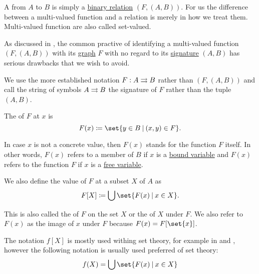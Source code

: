 \begin{definition}\label{def:multi_valued_function}
  A  from \( A \) to \( B \) is simply a \hyperref[def:binary_relation]{binary relation} \( (F, (A, B)) \). For us the difference between a multi-valued function and a relation is merely in how we treat them. Multi-valued function are also called set-valued.

  As discussed in , the common practive of identifying a multi-valued function \( (F, (A, B)) \) with its \hyperref[def:binary_relation/graph]{graph} \( F \) with no regard to its \hyperref[def:binary_relation/signature]{signature} \( (A, B) \) has serious drawbacks that we wish to avoid.

  We use the more established notation \( F: A \rightrightarrows B \) rather than \( (F, (A, B)) \) and call the string of symbols \( A \rightrightarrows B \) the signature of \( F \) rather than the tuple \( (A, B) \).

  \begin{thmenum}[series=def:multi_valued_function]
     The  of \( F \) at \( x \) is
    \begin{equation*}
      F(x) \coloneqq \set{ y \in B \given (x, y) \in F }.
    \end{equation*}

    In case \( x \) is not a concrete value, then \( F(x) \) stands for the function \( F \) itself. In other words, \( F(x) \) refers to a member of \( B \) if \( x \) is a \hyperref[def:first_order_syntax/formula_bound_variables]{bound variable} and \( F(x) \) refers to the function \( F \) if \( x \) is a \hyperref[def:first_order_syntax/formula_free_variables]{free variable}.

     We also define the value of \( F \) at a subset \( X \) of \( A \) as
    \begin{equation*}
      F[X] \coloneqq \bigcup \set{ F(x) \given x \in X }.
    \end{equation*}

    This is also called the  of \( F \) on the set \( X \) or the  of \( X \) under \( F \). We also refer to \( F(x) \) as the image of \( x \) under \( F \) because \( F(x) = F[\set{x}] \).

    The notation \( f[X] \) is mostly used withing set theory, for example in \cite[def. 2.31]{OpenLogicFull} and \cite[44]{Enderton1977Sets}, however the following notation is usually used preferred of set theory:
    \begin{equation*}
      f(X) = \bigcup \set{ F(x) \given x \in X }
    \end{equation*}


\end{thmenum}
\end{definition}
